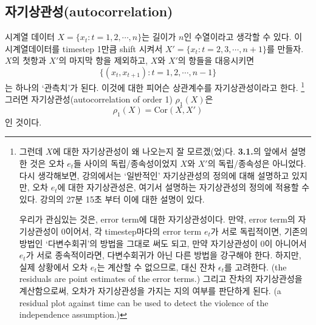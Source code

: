\documentclass{article}
\begin{document}
\subsection{자기상관성(autocorrelation)}
시계열 데이터 \(X=\{x_t:t=1,2,\cdots, n\}\)는 길이가 \(n\)인 수열이라고 생각할 수 있다.
이 시계열데이터를 timestep 1만큼 shift 시켜서 \(X'=\{x_t:t=2,3,\cdots, n+1\}\)를 만들자.
\(X\)의 첫항과 \(X'\)의 마지막 항을 제외하고, \(X\)와 \(X'\)의 항들을 대응시키면
\[\{(x_t,x_{t+1}):t=1,2,\cdots,n-1\}\]
는 하나의 `관측치'가 된다.
이것에 대한 피어슨 상관계수를 자기상관성이라고 한다.
\footnote{그런데 \(X\)에 대한 자기상관성이 왜 나오는지 잘 모르겠(었)다.
\textbf{3.1.}의 앞에서 설명한 것은 오차 \(e_t\)들 사이의 독립/종속성이었지 \(X\)와 \(X'\)의 독립/종속성은 아니었다.
다시 생각해보면, 강의에서는 `일반적인' 자기상관성의 정의에 대해 설명하고 있지만, 오차 \(e_t\)에 대한 자기상관성은, 여기서 설명하는 자기상관성의 정의에 적용할 수 있다.
강의의 27분 15초 부터 이에 대한 설명이 있다.

우리가 관심있는 것은, error term에 대한 자기상관성이다.
만약, error term의 자기상관성이 0이어서, 각 timestep마다의 error term \(e_t\)가 서로 독립적이면, 기존의 방법인 `다변수회귀'의 방법을 그대로 써도 되고, 만약 자기상관성이 0이 아니어서 \(e_t\)가 서로 종속적이라면, 다변수회귀가 아닌 다른 방법을 강구해야 한다.
하지만, 실제 상황에서 오차 \(e_t\)는 계산할 수 없으므로, 대신 잔차 \(\epsilon_t\)를 고려한다. (the residuals are point estimates of the error terms.)
그리고 잔차의 자기상관성을 계산함으로써, 오차가 자기상관성을 가지는 지의 여부를 판단하게 된다. (a residual plot against time can be used to detect the violence of the independence assumption.)}
그러면 자기상관성(autocorrelation of order 1) \(\rho_1(X)\)은\footnotemark
\begin{equation}\label{autocorrelation}
\rho_1(X)=\text{Cor}(X,X')
\end{equation}
인 것이다.
\end{document}
